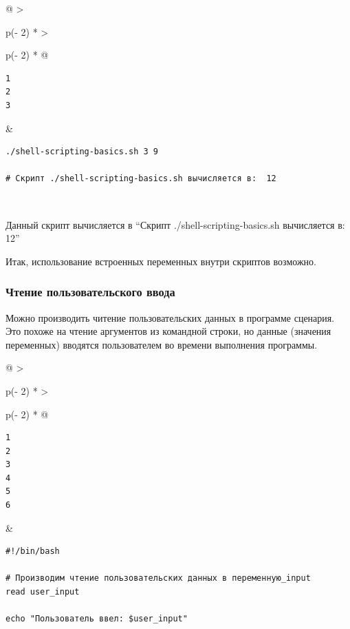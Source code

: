 \documentclass{report}
\begin{document}
\begin{longtable}[]{@{}
  >{\raggedright\arraybackslash}p{(\columnwidth - 2\tabcolsep) * }
  >{\raggedright\arraybackslash}p{(\columnwidth - 2\tabcolsep) * }@{}}
\toprule
\endhead
\begin{minipage}[t]{\linewidth}\raggedright
\begin{verbatim}
1
2
3
\end{verbatim}
\end{minipage} & \begin{minipage}[t]{\linewidth}\raggedright
\begin{verbatim}
./shell-scripting-basics.sh 3 9

# Скрипт ./shell-scripting-basics.sh вычисляется в:  12
\end{verbatim}
\end{minipage} \\ \addlinespace
\bottomrule
\end{longtable}

Данный скрипт вычисляется в ``Скрипт ./shell-scripting-basics.sh
вычисляется в: 12''

Итак, использование встроенных переменных внутри скриптов возможно.

\hypertarget{Reading-user-input}{%
\subsubsection{\texorpdfstring{\protect\hyperlink{Reading-user-input}{}Чтение
пользовательского
ввода}{Чтение пользовательского ввода}}\label{Reading-user-input}}

Можно производить читение пользовательских данных в программе сценария.
Это похоже на чтение аргументов из командной строки, но данные (значения
переменных) вводятся пользователем во времени выполнения программы.

\begin{longtable}[]{@{}
  >{\raggedright\arraybackslash}p{(\columnwidth - 2\tabcolsep) * }
  >{\raggedright\arraybackslash}p{(\columnwidth - 2\tabcolsep) * }@{}}
\toprule
\endhead
\begin{minipage}[t]{\linewidth}\raggedright
\begin{verbatim}
1
2
3
4
5
6
\end{verbatim}
\end{minipage} & \begin{minipage}[t]{\linewidth}\raggedright
\begin{verbatim}
#!/bin/bash

# Производим чтение пользовательских данных в переменную_input
read user_input

echo "Пользователь ввел: $user_input"
\end{verbatim}
\end{minipage} \\ \addlinespace
\bottomrule
\end{longtable}
\end{document}
